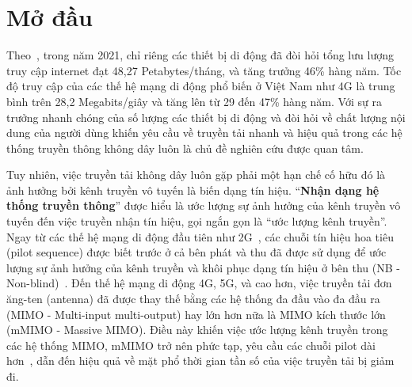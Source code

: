 \clearpage
{}

\chapter*{Mở đầu}
\label{sec:intro}


Theo~\cite{Mtawa2019}, trong năm 2021, chỉ riêng các thiết bị di động đã đòi hỏi tổng lưu lượng truy cập internet đạt 48,27 Petabytes/tháng, và tăng trưởng 46\% hàng năm. Tốc độ truy cập của các thế hệ mạng di động phổ biến ở Việt Nam như 4G là trung bình trên 28,2 Megabits/giây và tăng lên từ 29 đến 47\% hàng năm. Với sự ra trưởng nhanh chóng của số lượng các thiết bị di động và đòi hỏi về chất lượng nội dung của người dùng khiến yêu cầu về truyền tải nhanh và hiệu quả trong các hệ thống truyền thông không dây luôn là chủ đề nghiên cứu được quan tâm.

Tuy nhiên, việc truyền tải không dây luôn gặp phải một hạn chế cố hữu đó là ảnh hưởng bởi kênh truyền vô tuyến là biến dạng tín hiệu.
``\textbf{Nhận dạng hệ thống truyền thông}'' được hiểu là ước lượng sự ảnh hưởng của kênh truyền vô tuyến đến việc truyền nhận tín hiệu, gọi ngắn gọn là ``ước lượng kênh truyền''.
Ngay từ các thế hệ mạng di động đầu tiên như 2G~\cite{Tse2005}, các chuỗi tín hiệu hoa tiêu (pilot sequence) được biết trước ở cả bên phát và thu đã được sử dụng để ước lượng sự ảnh hưởng của kênh truyền và khôi phục dạng tín hiệu ở bên thu (NB - Non-blind)~\cite{ljung1999system}. Đến thế hệ mạng di động 4G, 5G, và cao hơn, việc truyền tải đơn ăng-ten (antenna) đã được thay thế bằng các hệ thống đa đầu vào đa đầu ra (MIMO - Multi-input multi-output) hay lớn hơn nữa là MIMO kích thước lớn (mMIMO - Massive MIMO). Điều này khiến việc ước lượng kênh truyền trong các hệ thống MIMO, mMIMO trở nên phức tạp, yêu cầu các chuỗi pilot dài hơn~\cite{Michelusi2009}, dẫn đến hiệu quả về mặt phổ thời gian tần số của việc truyền tải bị giảm đi. 

